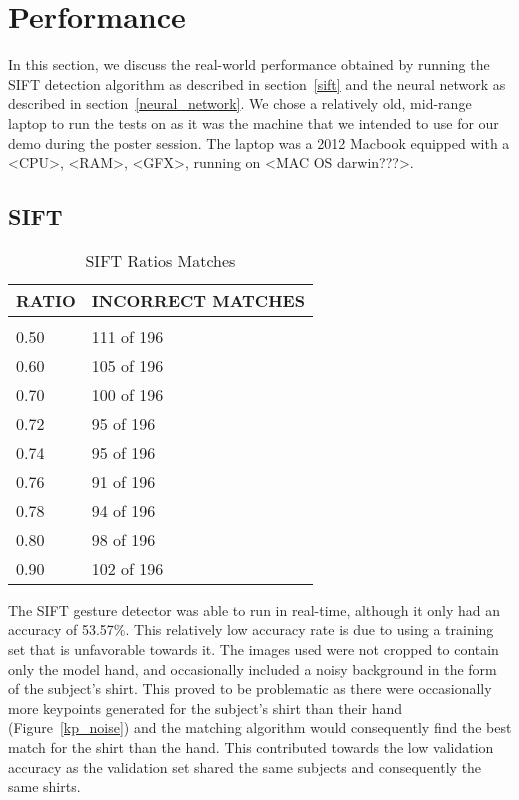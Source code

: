 \section{Performance}
\label{performance}

In this section, we discuss the real-world performance obtained by running the SIFT detection algorithm as described in section~\ref{sift} and the neural network as described in section~\ref{neural_network}. We chose a relatively old, mid-range laptop to run the tests on as it was the machine that we intended to use for our demo during the poster session. The laptop was a 2012 Macbook equipped with a <CPU>, <RAM>, <GFX>, running on <MAC OS darwin???>.

\subsection{SIFT}
\label{perf_SIFT}

\begin{table}[t]
\caption{SIFT Ratios Matches}
\label{sift_ratios}
\begin{center}
\begin{tabular}{ll}
\multicolumn{1}{c}{\bf RATIO}  &\multicolumn{1}{c}{\bf INCORRECT MATCHES}
\\ \hline \\
0.50             &111 of 196 \\
0.60             &105 of 196 \\
0.70             &100 of 196 \\
0.72             &95 of 196 \\
0.74             &95 of 196 \\
0.76             &91 of 196 \\
0.78             &94 of 196 \\
0.80             &98 of 196 \\
0.90             &102 of 196 \\
\end{tabular}
\end{center}
\end{table}

The SIFT gesture detector was able to run in real-time, although it only had an accuracy of 53.57\%. This relatively low accuracy rate is due to using a training set that is unfavorable towards it. The images used were not cropped to contain only the model hand, and occasionally included a noisy background in the form of the subject's shirt. This proved to be problematic as there were occasionally more keypoints generated for the subject's shirt than their hand (Figure~\ref{kp_noise}) and the matching algorithm would consequently find the best match for the shirt than the hand. This contributed towards the low validation accuracy as the validation set shared the same subjects and consequently the same shirts.

